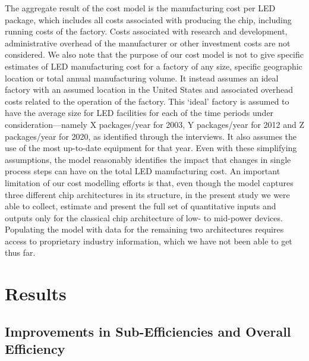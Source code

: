 \documentclass[twoside,twocolumn,9pt]{article}
\begin{document}
The aggregate result of the cost model is the manufacturing cost per LED package, which includes all costs associated with producing the chip, including running costs of the factory. Costs associated with research and development, administrative overhead of the manufacturer or other investment costs are not considered. We also note that the purpose of our cost model is not to give specific estimates of LED manufacturing cost for a factory of any size, specific geographic location or total annual manufacturing volume. It instead assumes an ideal factory with an assumed location in the United States and associated overhead costs related to the operation of the factory. This ‘ideal’ factory is assumed to have the average size for LED facilities for each of the time periods under consideration—namely X packages/year for 2003, Y packages/year for 2012 and Z packages/year for 2020, as identified through the interviews. It also assumes the use of the most up-to-date equipment for that year. Even with these simplifying assumptions, the model reasonably identifies the impact that changes in single process steps can have on the total LED manufacturing cost. An important limitation of our cost modelling efforts is that, even though the model captures three different chip architectures in its structure, in the present study we were able to collect, estimate and present the full set of quantitative inputs and outputs only for the classical chip architecture of low- to mid-power devices. Populating the model with data for the remaining two architectures requires access to proprietary industry information, which we have not been able to get thus far.  

\section{Results}

\subsection{Improvements in Sub-Efficiencies and Overall Efficiency}
\end{document}
